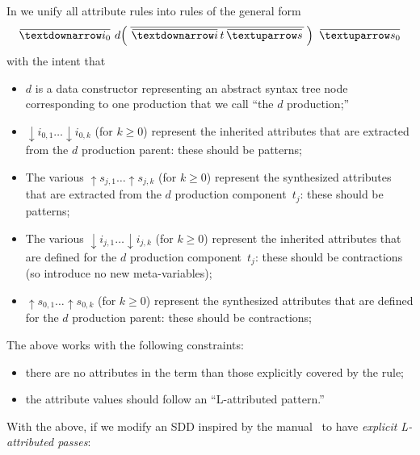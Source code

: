 \documentclass[11pt]{article} %
\begin{document}
In  we unify all attribute rules into rules of the general form
\begin{equation*}
  \ov{{↓}i_0}  ~ d\!\left(\,\ov{\, \ov{{↓}i} \, t \, \ov{{↑}s} \,}\,\right) ~ \ov{{↑}s_0}
  \label{eq:attributes}
\end{equation*}
with the intent that
\begin{itemize}

\item $d$ is a data constructor representing an abstract syntax tree node corresponding to one
  production that we call ``the $d$ production;''

\item ${↓}i_{0,1}…{↓}i_{0,k}$ (for $k≥0$) represent the inherited attributes that are extracted from
  the $d$ production parent: these should be patterns;

\item The various ${↑}s_{j,1}…{↑}s_{j,k}$ (for $k≥0$) represent the synthesized attributes that are
  extracted from the $d$ production component~$t_j$: these should be patterns;

\item The various ${↓}i_{j,1}…{↓}i_{j,k}$ (for $k≥0$) represent the inherited attributes that are
  defined for the $d$ production component~$t_j$: these should be contractions (so introduce no new
  meta-variables);

\item ${↑}s_{0,1}…{↑}s_{0,k}$ (for $k≥0$) represent the synthesized attributes that are defined for
  the $d$ production parent: these should be contractions;

\end{itemize}
The above works with the following constraints:
\begin{itemize}
\item there are no attributes in the term than those explicitly covered by the rule;
\item the attribute values should follow an ``L-attributed pattern.''
\end{itemize}
With the above, if we modify an SDD inspired by the manual~\cite{Rose:ts2016} to have \emph{explicit
  L-attributed passes}:
\end{document}
